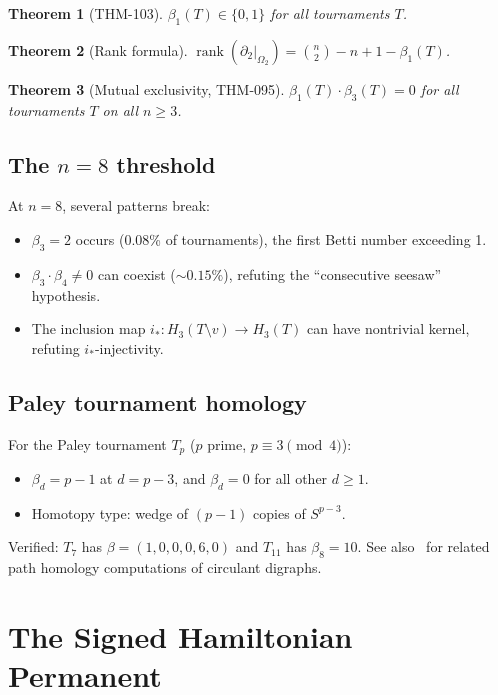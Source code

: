 \documentclass[12pt,reqno]{amsart}
\theoremstyle{plain}
\newtheorem{theorem}{Theorem}[section]
\theoremstyle{definition}
\theoremstyle{remark}
\DeclareMathOperator{\rank}{rank}
\begin{document}
\begin{theorem}[THM-103]\label{thm:beta1}
$\beta_1(T) \in \{0, 1\}$ for all tournaments $T$.
\end{theorem}

\begin{theorem}[Rank formula]
$\rank(\partial_2|_{\Omega_2}) = \binom{n}{2} - n + 1 - \beta_1(T)$.
\end{theorem}

\begin{theorem}[Mutual exclusivity, THM-095]
$\beta_1(T) \cdot \beta_3(T) = 0$ for all tournaments $T$ on all $n \geq 3$.
\end{theorem}

\subsection{The $n = 8$ threshold}

At $n = 8$, several patterns break:

\begin{itemize}
\item $\beta_3 = 2$ occurs (0.08\% of tournaments), the first Betti number exceeding 1.
\item $\beta_3 \cdot \beta_4 \neq 0$ can coexist ($\sim 0.15\%$), refuting the
``consecutive seesaw'' hypothesis.
\item The inclusion map $i_*: H_3(T \setminus v) \to H_3(T)$ can have nontrivial
kernel, refuting $i_*$-injectivity.
\end{itemize}

\subsection{Paley tournament homology}

For the Paley tournament $T_p$ ($p$ prime, $p \equiv 3 \pmod{4}$):
\begin{itemize}
\item $\beta_d = p - 1$ at $d = p - 3$, and $\beta_d = 0$ for all other $d \geq 1$.
\item Homotopy type: wedge of $(p-1)$ copies of $S^{p-3}$.
\end{itemize}
Verified: $T_7$ has $\beta = (1, 0, 0, 0, 6, 0)$ and $T_{11}$ has $\beta_8 = 10$.
See also~\cite{TangYau2026} for related path homology computations of circulant digraphs.

\section{The Signed Hamiltonian Permanent}\label{sec:signed}
\end{document}
